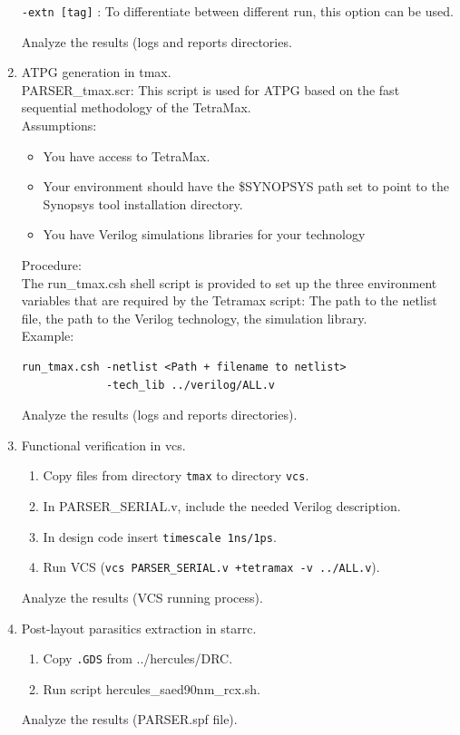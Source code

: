 \documentclass[a4paper,12pt,twoside]{article}
\begin{document}
\begin{enumerate}
    \texttt{-extn [tag]} : To differentiate between different run, this option can be used.

    Analyze the results (logs and reports directories.
    \item ATPG generation in tmax.\\
    PARSER\_tmax.scr: This script is used for ATPG based on the fast sequential methodology of the TetraMax.\\
    Assumptions:
    \begin{itemize}
        \item You have access to TetraMax.
        \item Your environment should have the \$SYNOPSYS path set to point to the Synopsys tool installation directory.
        \item You have Verilog simulations libraries for your technology
    \end{itemize}
    Procedure:\\
    The run\_tmax.csh shell script is provided to set up the three environment variables that are required by the Tetramax script: The path to the netlist file, the path to the Verilog technology, the simulation library.\\
    Example:
    \begin{verbatim}
run_tmax.csh -netlist <Path + filename to netlist>
             -tech_lib ../verilog/ALL.v
    \end{verbatim}
    Analyze the results (logs and reports directories).
    \item Functional verification in vcs.
    \begin{enumerate}
        \item Copy files from directory \texttt{tmax} to directory \texttt{vcs}.
        \item In PARSER\_SERIAL.v, include the needed Verilog description.
        \item In design code insert \texttt{timescale 1ns/1ps}.
        \item Run VCS (\texttt{vcs PARSER\_SERIAL.v +tetramax -v ../ALL.v}).
    \end{enumerate}
    Analyze the results (VCS running process).
    \item Post-layout parasitics extraction in starrc.
    \begin{enumerate}
        \item Copy \texttt{.GDS} from ../hercules/DRC.
        \item Run script hercules\_saed90nm\_rcx.sh.
    \end{enumerate}
    Analyze the results (PARSER.spf file).
\end{enumerate}
\end{document}
